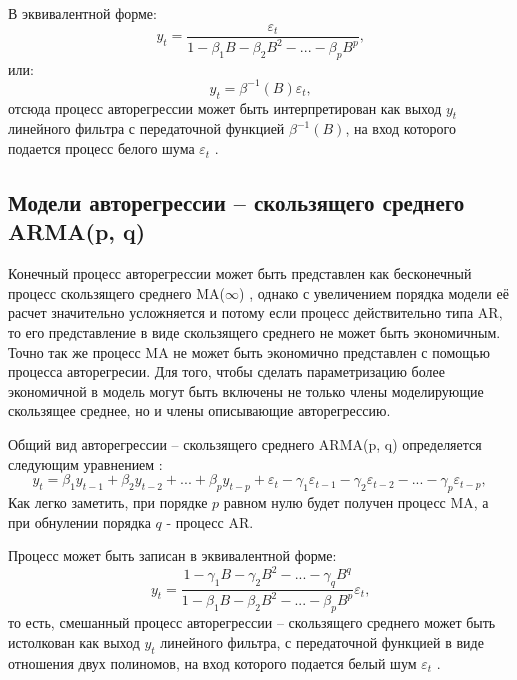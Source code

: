 \documentclass[a4paper,14pt,russian]{extreport}
\begin{document}
В эквивалентной форме:
\begin{equation}
	y_t = \frac{\varepsilon_t}{1 - \beta_1 B - \beta_2 B^2 - ... - \beta_p B^p} \text{,} 
\end{equation}
или:
\begin{equation}
	y_t = \beta^{-1}(B)\varepsilon_t \text{,}
\end{equation}
отсюда процесс авторегрессии может быть интерпретирован как выход $y_t$ 
линейного фильтра с передаточной функцией $\beta^{-1}(B)$, на вход которого 
подается процесс белого шума $\varepsilon_t$ \cite{box2008}. 


\subsection{Модели авторегрессии -- скользящего среднего ARMA(p, q)}
Конечный процесс авторегрессии может быть представлен как бесконечный 
процесс скользящего среднего MA($\infty$) \cite{hamilton1994, chatfield2000}, 
однако с увеличением порядка модели её расчет значительно усложняется и 
потому если процесс действительно типа AR, то его представление в виде 
скользящего среднего не может быть экономичным. Точно так же процесс MA не 
может быть экономично представлен с помощью процесса авторегресии. Для 
того, чтобы сделать параметризацию более экономичной в модель могут быть 
включены не только члены моделирующие скользящее среднее, но и члены 
описывающие авторегрессию.

Общий вид авторегрессии -- скользящего среднего ARMA(p, q) определяется 
следующим уравнением \cite{runova2013}:
\begin{equation}
	y_t = \beta_1 y_{t-1} + \beta_2 y_{t-2} + ... + \beta_p y_{t-p} + \varepsilon_t 
		- \gamma_1 \varepsilon_{t-1} - \gamma_2 \varepsilon_{t-2}  - ... 
		- \gamma_p \varepsilon_{t-p}, 
\end{equation}
Как легко заметить, при порядке $p$ равном нулю будет получен процесс MA, 
а при обнулении порядка $q$ - процесс AR. 

Процесс  может быть записан в эквивалентной форме:
\begin{equation}
	y_t = \frac
		{1 - \gamma_1 B - \gamma_2 B^2 - ... - \gamma_q B^q}
		{1 - \beta_1 B - \beta_2 B^2 - ... - \beta_p B^p}  \varepsilon_t \text{,} 
\end{equation}
то есть, смешанный процесс авторегрессии -- скользящего среднего 
может быть истолкован как выход $y_t$ линейного фильтра, с передаточной 
функцией в виде отношения двух полиномов, на вход которого подается белый 
шум $\varepsilon_t$ \cite{box2008}. 
 
\end{document}

